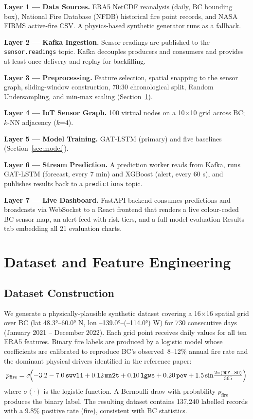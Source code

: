 \documentclass[conference]{IEEEtran}
\begin{document}
\noindent\textbf{Layer 1 — Data Sources.}
ERA5 NetCDF reanalysis (daily, BC bounding box), National Fire Database
(NFDB) historical fire point records, and NASA FIRMS active-fire CSV.
A physics-based synthetic generator runs as a fallback.

\noindent\textbf{Layer 2 — Kafka Ingestion.}
Sensor readings are published to the \texttt{sensor.readings} topic.
Kafka decouples producers and consumers and provides at-least-once delivery
and replay for backfilling.

\noindent\textbf{Layer 3 — Preprocessing.}
Feature selection, spatial snapping to the sensor graph, sliding-window
construction, 70:30 chronological split, Random Undersampling, and
min-max scaling (Section~\ref{sec:data}).

\noindent\textbf{Layer 4 — IoT Sensor Graph.}
100 virtual nodes on a 10$\times$10 grid across BC; $k$-NN adjacency ($k$=4).

\noindent\textbf{Layer 5 — Model Training.}
GAT-LSTM (primary) and five baselines (Section~\ref{sec:model}).

\noindent\textbf{Layer 6 — Stream Prediction.}
A prediction worker reads from Kafka, runs GAT-LSTM (forecast, every 7 min)
and XGBoost (alert, every 60 s), and publishes results back to a
\texttt{predictions} topic.

\noindent\textbf{Layer 7 — Live Dashboard.}
FastAPI backend consumes predictions and broadcasts via WebSocket to a React
frontend that renders a live colour-coded BC sensor map, an alert feed with
risk tiers, and a full model evaluation Results tab embedding all 21
evaluation charts.

\section{Dataset and Feature Engineering}
\label{sec:data}

\subsection{Dataset Construction}

We generate a physically-plausible synthetic dataset covering a
16$\times$16 spatial grid over BC (lat 48.3°–60.0° N,
lon –139.0°–(–114.0°) W) for 730 consecutive days (January 2021 –
December 2022). Each grid point receives daily values for all ten ERA5
features. Binary fire labels are produced by a logistic model whose
coefficients are calibrated to reproduce BC's observed~8–12\% annual
fire rate and the dominant physical drivers identified in the reference
paper:
\begin{equation}
  p_{\text{fire}} = \sigma\!\Bigl(
    -3.2 - 7.0\,\texttt{swvl1} + 0.12\,\texttt{mn2t}
    + 0.10\,\texttt{lgws} + 0.20\,\texttt{pev}
    + 1.5\sin\!\tfrac{2\pi(\texttt{DOY}-80)}{365}
  \Bigr)
  \label{eq:firesim}
\end{equation}
where $\sigma(\cdot)$ is the logistic function. A Bernoulli draw with
probability $p_{\text{fire}}$ produces the binary label. The resulting
dataset contains 137,240 labelled records with a 9.8\% positive rate
(fire), consistent with BC statistics.
\end{document}
